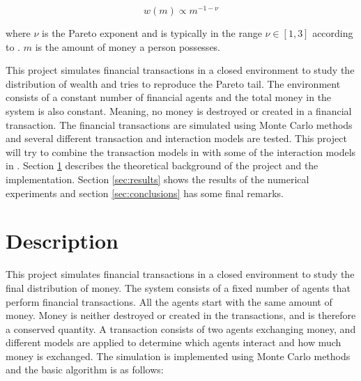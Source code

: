 \documentclass{article}
\begin{document}
\begin{equation}
w(m) \propto m^{-1-\nu}
\label{eq:pareto}
\end{equation}

\noindent where $\nu$ is the Pareto exponent and is typically in the range $\nu \in [1,3]$ according to \cite{interaction}. $m$ is the amount of money a person possesses. 

This project simulates financial transactions in a closed environment to study the distribution of wealth and tries to reproduce the Pareto tail. The environment consists of a constant number of financial agents and the total money in the system is also constant. Meaning, no money is destroyed or created in a financial transaction. The financial transactions are simulated using Monte Carlo methods and several different transaction and interaction models are tested. This project will try to combine the transaction models in \cite{gibbs} with some of the interaction models in \cite{interaction}. Section \ref{sec:description} describes the theoretical background of the project and the implementation. Section \ref{sec:results} shows the results of the numerical experiments and section \ref{sec:conclusions} has some final remarks.

\section{Description}
\label{sec:description}
This project simulates financial transactions in a closed environment to study the final distribution of money. The system consists of a fixed number of agents that perform financial transactions. All the agents start with the same amount of money. Money is neither destroyed or created in the transactions, and is therefore a conserved quantity. A transaction consists of two agents exchanging money, and different models are applied to determine which agents interact and how much money is exchanged. The simulation is implemented using Monte Carlo methods and the basic algorithm is as follows:
\end{document}
